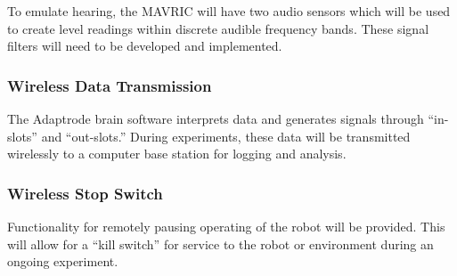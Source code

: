 \documentclass{article}
\begin{document}
            To emulate hearing, the MAVRIC will have two audio sensors
            which will be used to create level readings
            within discrete audible frequency bands.
            These signal filters will need to be developed and implemented.

        \subsubsection{Wireless Data Transmission}
        
            The Adaptrode brain software interprets data and generates signals
            through ``in-slots'' and ``out-slots.''
            During experiments, these data will be transmitted wirelessly
            to a computer base station for logging and analysis.

        \subsubsection{Wireless Stop Switch}
        
            Functionality for remotely pausing operating of the robot
            will be provided.
            This will allow for a ``kill switch''
            for service to the robot or environment
            during an ongoing experiment.
\end{document}
